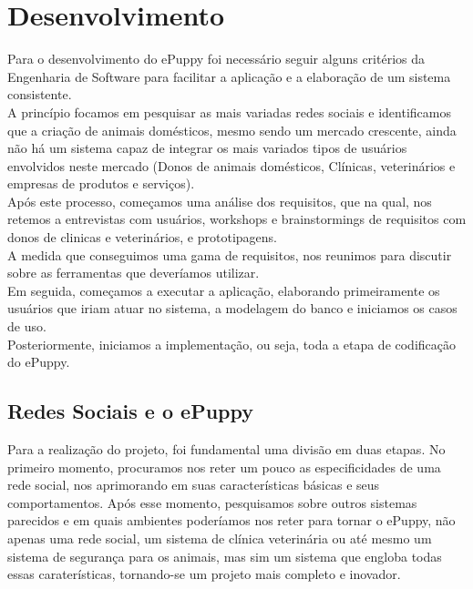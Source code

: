 \chapter{Desenvolvimento}

Para o desenvolvimento do ePuppy foi necessário seguir alguns critérios da Engenharia de Software para facilitar a aplicação e a elaboração de um sistema consistente.
\\
\indent
A princípio focamos em pesquisar as mais variadas redes sociais e identificamos que a criação de animais domésticos, mesmo sendo um mercado crescente, ainda não há um sistema capaz de integrar os mais variados tipos de usuários envolvidos neste mercado (Donos de animais domésticos, Clínicas, veterinários e empresas de produtos e serviços).
\\
\indent
Após este processo, começamos uma análise dos requisitos, que na qual, nos retemos a entrevistas com usuários, workshops e brainstormings de requisitos com donos de clinicas e veterinários, e prototipagens. 
\\
\indent
A medida que conseguimos uma gama de requisitos, nos reunimos para discutir sobre as ferramentas que deveríamos utilizar.
\\
\indent
Em seguida, começamos a executar a aplicação, elaborando primeiramente os usuários que iriam atuar no sistema, a modelagem do banco e iniciamos os casos de uso. 
\\
\indent
Posteriormente, iniciamos a implementação, ou seja, toda a etapa de codificação do ePuppy.

\section{Redes Sociais e o ePuppy}

Para a realização do projeto, foi fundamental uma divisão em duas etapas. No primeiro momento, procuramos nos reter um pouco as especificidades de uma rede social, nos aprimorando em suas características básicas e seus comportamentos. Após esse momento, pesquisamos sobre outros sistemas parecidos e em quais ambientes poderíamos nos reter para tornar o ePuppy, não apenas uma rede social, um sistema de clínica veterinária ou até mesmo um sistema de segurança para os animais, mas sim um sistema que engloba todas essas caraterísticas, tornando-se um projeto mais completo e inovador.


